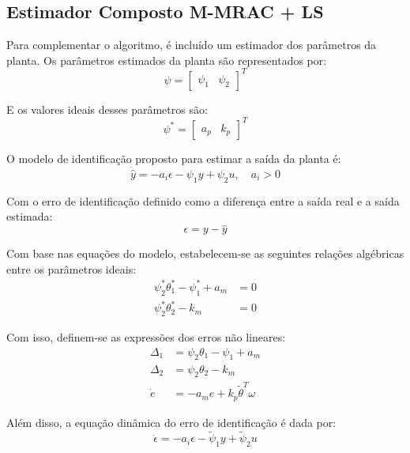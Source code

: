\documentclass[10pt]{article}
\begin{document}
\subsection{Estimador Composto M-MRAC + LS}

Para complementar o algoritmo, é incluído um estimador dos parâmetros da planta. Os parâmetros estimados da planta são representados por:
\begin{equation}
    \psi = \begin{bmatrix} \psi_1 & \psi_2 \end{bmatrix}^T
\end{equation}

E os valores ideais desses parâmetros são:
\begin{equation}
    \psi^* = \begin{bmatrix} a_p & k_p \end{bmatrix}^T
\end{equation}

O modelo de identificação proposto para estimar a saída da planta é:
\begin{equation}
    \dot{\hat{y}} = -a_i \epsilon - \psi_1 y + \psi_2 u, \quad a_i > 0
\end{equation}

Com o erro de identificação definido como a diferença entre a saída real e a saída estimada:
\begin{equation}
    \epsilon = y - \hat{y}
\end{equation}

Com base nas equações do modelo, estabelecem-se as seguintes relações algébricas entre os parâmetros ideais:
\begin{align}
    \psi_2^* \theta_1^* - \psi_1^* + a_m &= 0 \\
    \psi_2^* \theta_2^* - k_m &= 0
\end{align}

Com isso, definem-se as expressões dos erros não lineares:
\begin{align}
    \Delta_1 &= \psi_2 \theta_1 - \psi_1 + a_m \\
    \Delta_2 &= \psi_2 \theta_2 - k_m \\
    \dot{e} &= -a_m e + k_p \tilde{\theta}^T \omega
\end{align}

Além disso, a equação dinâmica do erro de identificação é dada por:
\begin{equation}
    \dot{\epsilon} = -a_i \epsilon - \tilde{\psi}_1 y + \tilde{\psi}_2 u
\end{equation}
\end{document}
